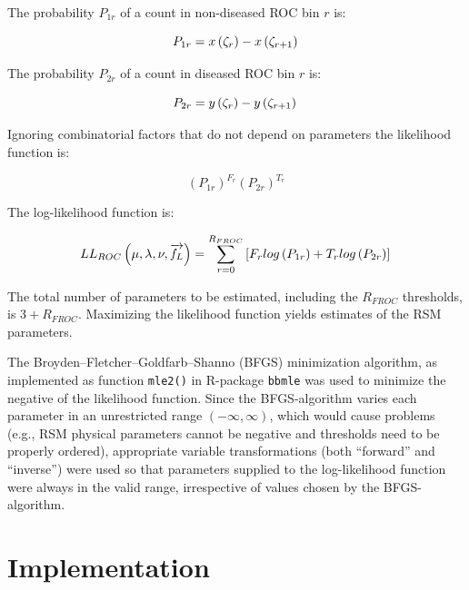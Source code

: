 \documentclass[
]{book}
\begin{document}
The probability \(P_{1r}\) of a count in non-diseased ROC bin \(r\) is:

\begin{equation}
P_{1r} = x\left ( \zeta_r \right ) - x\left ( \zeta_{r+1} \right )\\ 
\label{eq:rsm-fitting-roc-p1r}
\end{equation}

The probability \(P_{2r}\) of a count in diseased ROC bin \(r\) is:

\begin{equation}
P_{2r} = y\left ( \zeta_r \right ) - y\left ( \zeta_{r+1} \right )\\ 
\label{eq:rsm-fitting-roc-p2r}
\end{equation}

Ignoring combinatorial factors that do not depend on parameters the likelihood function is:

\[\left ( P_{1r} \right )^{F_r}  \left ( P_{2r} \right )^{T_r}\]

The log-likelihood function is:

\begin{equation}
LL_{ROC} \left ( \mu, \lambda, \nu, \overrightarrow{f_L} \right )= \sum_{r=0}^{R_{FROC}} \left [F_r log \left (P_{1r}  \right ) + T_r log \left (P_{2r}  \right )  \right ] \\
\label{eq:rsm-fitting-roc-ll2}
\end{equation}

The total number of parameters to be estimated, including the \(R_{FROC}\) thresholds, is \(3+R_{FROC}\). Maximizing the likelihood function yields estimates of the RSM parameters.

The Broyden--Fletcher--Goldfarb--Shanno (BFGS) \citep{RN2646, RN2647, RN2648, RN2649, RN2651, RN2650} minimization algorithm, as implemented as function \texttt{mle2()} in R-package \texttt{bbmle} \citep{bbmle} was used to minimize the negative of the likelihood function. Since the BFGS-algorithm varies each parameter in an unrestricted range \((-\infty, \infty)\), which would cause problems (e.g., RSM physical parameters cannot be negative and thresholds need to be properly ordered), appropriate variable transformations (both ``forward'' and ``inverse'') were used so that parameters supplied to the log-likelihood function were always in the valid range, irrespective of values chosen by the BFGS-algorithm.

\hypertarget{rsm-fitting-fitrsmroc-implementation}{%
\section{Implementation}\label{rsm-fitting-fitrsmroc-implementation}}
\end{document}
